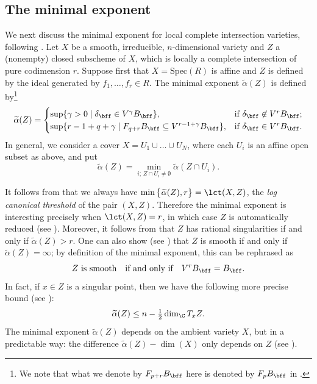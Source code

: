 \subsection{The minimal exponent}\label{section_min_exponent}
We next discuss the minimal exponent for local complete intersection varieties, following \cite{CDMO}. Let $X$ be a smooth,
irreducible, $n$-dimensional variety and $Z$ a (nonempty) closed subscheme of $X$, which is locally a complete intersection of pure codimension $r$. Suppose first
that $X=\mathrm{Spec}(R)$ is affine
and $Z$ is defined by the ideal generated by $f_1,\ldots,f_r\in R$. The minimal exponent $\widetilde{\alpha}(Z)$ is defined by\footnote{We note that what we
denote by $F_{p+r}B_{\bff}$ here is denoted by $F_pB_{\bff}$ in \cite{CDMO}.}
\begin{equation}\label{eq3_intro_v2}
\widetilde{\alpha}(Z)
=
\begin{cases}
\sup\{\gamma>0\mid \delta_\bff\in V^{\gamma}B_{\bff}\}, & \text{if}\,\,\delta_\bff\not\in V^rB_\bff; \\
\sup\{r-1+q+\gamma\mid F_{q+r}B_{\bff}\subseteq V^{r-1+\gamma}B_{\bff}\}, & \text{if}\,\,\delta_\bff\in V^rB_\bff.
\end{cases}
\end{equation}
In general, we consider a cover $X=U_1\cup\ldots\cup U_N$, where each $U_i$ is an affine open subset as above, and put
\[\widetilde{\alpha}(Z)=\min_{i;\,Z\cap U_i\neq\emptyset}\widetilde{\alpha}(Z\cap U_i).\]

It follows from \cite[Th.\,1]{BMS} that we always have $\min\big\{\widetilde{\alpha}(Z),r\big\}=\lct(X,Z)$, the \emph{log canonical threshold} of the pair $(X,Z)$. Therefore the minimal exponent is interesting
precisely when $\lct(X,Z)=r$, in which case $Z$ is automatically reduced (see \cite[Rem.\,4.2]{CDMO}). Moreover, it follows from \cite[Cor.\,1.7]{CDMO}
that $Z$ has rational singularities if and only if $\widetilde{\alpha}(Z)>r$. One can also show (see \cite[Rem.\,4.15]{CDMO}) that $Z$ is smooth if and only if $\widetilde{\alpha}(Z)=\infty$; by definition
of the minimal exponent, this can be rephrased as
\begin{equation}\label{eq_char_V_smooth}
Z\,\,\text{is smooth}\quad\text{if and only if}\quad V^rB_{\bff}=B_{\bff}.
\end{equation}
In fact,
if $x\in Z$ is a singular point, then we have the following more precise bound (see \cite[Rem.\,4.21]{CDMO}):
\begin{equation}\label{eq_bd_min_exp}
\widetilde{\alpha}(Z)\leq n-\tfrac{1}{2}\dim_{\C}T_xZ.
\end{equation}
The minimal exponent $\widetilde{\alpha}(Z)$ depends on the ambient variety $X$, but in a predictable way: the difference $\widetilde{\alpha}(Z)-\dim(X)$
only depends on $Z$ (see \cite[Prop.\,4.14]{CDMO}).


